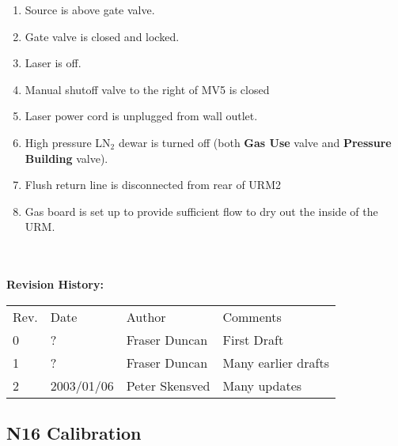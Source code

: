 \begin{enumerate}
\begin{center}
           {\bf After Calibration}
\end{center}
\item\checkbox Source is above gate valve.
\item\checkbox Gate valve is closed and locked.
\item\checkbox Laser is off.
\item\checkbox Manual shutoff valve to the right of MV5 is closed
\item\checkbox Laser power cord is unplugged from wall outlet.
\item\checkbox High pressure LN$_2$ dewar is turned off (both {\bf Gas Use} valve and 
  {\bf Pressure Building} valve).
\item\checkbox Flush return line is disconnected from rear of URM2
\item\checkbox Gas board is set up to provide sufficient flow to dry out the inside
of the URM.

\end{enumerate}


   

{\small
~\\
~\\
\noindent
{\bf Revision History:}\\
\begin{tabular}{llll}
Rev. & Date & Author & Comments\\

0             & 
?    & 
Fraser Duncan &
\parbox[t]{3.0in}{
  First Draft
}\\

1             & 
?    & 
Fraser Duncan &
\parbox[t]{3.0in}{
  Many earlier drafts
}\\


2             & 
2003/01/06 & 
Peter Skensved &
\parbox[t]{3.0in}{
  Many updates
}\\


\end{tabular}
}


\newpage
\subsection{N16 Calibration}


